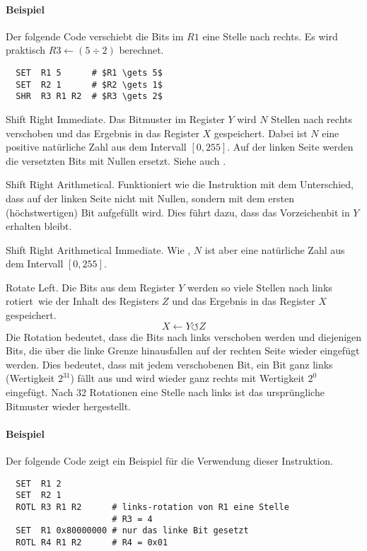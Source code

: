 \paragraph{Beispiel}
Der folgende Code verschiebt die Bits im $R1$ eine Stelle nach rechts.
Es wird praktisch $R3 \gets (5 \div 2)$ berechnet.
\begin{lstlisting}
  SET  R1 5      # $R1 \gets 5$
  SET  R2 1      # $R2 \gets 1$
  SHR  R3 R1 R2  # $R3 \gets 2$
\end{lstlisting}


\glqq Shift Right Immediate\grqq.
Das Bitmuster im Register $Y$ wird $N$ Stellen nach rechts verschoben und das
Ergebnis in das Register $X$ gespeichert.
Dabei ist $N$ eine positive natürliche Zahl aus dem Intervall $[0, 255]$.
Auf der linken Seite werden die versetzten Bits mit Nullen ersetzt.
Siehe auch .



\glqq Shift Right Arithmetical\grqq.
Funktioniert wie die Instruktion  mit dem Unterschied, dass auf der
linken Seite nicht mit Nullen, sondern mit dem ersten (höchstwertigen) Bit
aufgefüllt wird. Dies führt dazu, dass das Vorzeichenbit in $Y$ erhalten
bleibt.


\glqq Shift Right Arithmetical Immediate\grqq.
Wie , $N$ ist aber eine natürliche Zahl aus dem Intervall
$[0, 255]$.



\glqq Rotate Left\grqq.
Die Bits aus dem Register $Y$ werden so viele Stellen nach links \glqq
rotiert\grqq\ wie der Inhalt des Registers $Z$ und das Ergebnis in das Register
$X$ gespeichert.
\[
    X \gets Y \circlearrowleft Z
\]
Die Rotation bedeutet, dass die Bits nach links verschoben
werden und diejenigen Bits, die über die linke Grenze hinausfallen auf der
rechten Seite wieder eingefügt werden. 
Dies bedeutet, dass mit jedem verschobenen Bit, ein Bit ganz links (Wertigkeit
$2^{31}$) fällt aus und wird wieder ganz rechts mit Wertigkeit $2^{0}$ eingefügt.
Nach 32 Rotationen eine Stelle nach links ist das ursprüngliche Bitmuster
wieder hergestellt.

\paragraph{Beispiel}
Der folgende Code zeigt ein Beispiel für die Verwendung dieser Instruktion.
\begin{lstlisting}
  SET  R1 2
  SET  R2 1
  ROTL R3 R1 R2      # links-rotation von R1 eine Stelle
                     # R3 = 4
  SET  R1 0x80000000 # nur das linke Bit gesetzt
  ROTL R4 R1 R2      # R4 = 0x01
\end{lstlisting}


